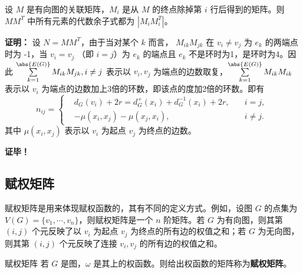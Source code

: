 \begin{theorem}{}
设 $M$ 是有向图的关联矩阵，$M_i$ 是从 $M$ 的终点除掉第 $i$ 行后得到的矩阵。则 $MM^T$ 中所有元素的代数余子式都为 $|M_iM_i^T|$。

\end{theorem}
\textbf{证明：}
设 $N=MM^T$，由于当对某个 $k$ 而言， $M_{ik}M_{jk}$ 在 $v_i\neq v_j$ 为 $e_k$ 的两端点时为 -1，当 $v_i=v_j$ （即 $i=j$）为 $e_k$ 的端点且 $e_k$ 不是环时为1，是环时为4。因此 $\sum\limits_{k=1}^{\abs{E(G)}}M_{ik}M_{jk},i\neq j$ 表示以 $v_i,v_j$ 为端点的边数取复，$\sum\limits_{k=1}^{\abs{E(G)}}M_{ik}M_{ik}$ 表示以 $v_i$ 为端点的边数加上3倍的环数，即该点的度加2倍的环数。即有
\begin{equation}
n_{ij}=\left\{\begin{aligned}
&d_G(v_i)+2r=d_G^+(x_i)+d_G^{-1}(x_i)+2r,\quad &i=j,\\
&-\mu(x_i,x_j)-\mu(x_j,x_i),\quad &i\neq j.
\end{aligned}\right.~
\end{equation}
其中 $\mu(x_i,x_j)$ 表示以 $v_i$ 为起点 $v_j$ 为终点的边数。

\textbf{证毕！}


\subsection{赋权矩阵}

赋权矩阵是用来体现赋权函数的，其有不同的定义方式。例如，设图 $G$ 的点集为 $V(G)=\{v_1,\cdots,v_n\}$，则赋权矩阵是一个 $n$ 阶矩阵。若 $G$ 为有向图，则其第 $(i,j)$ 个元反映了以 $v_i$ 为起点 $v_j$ 为终点的所有边的权值之和；若 $G$ 为无向图，则其第 $(i,j)$ 个元反映了连接 $v_i,v_j$ 的所有边的权值之和。
\begin{definition}{赋权矩阵}
若 $G$ 是图，$\omega$ 是其上的权函数。则给出权函数的矩阵称为\textbf{赋权矩阵}。
\end{definition}









